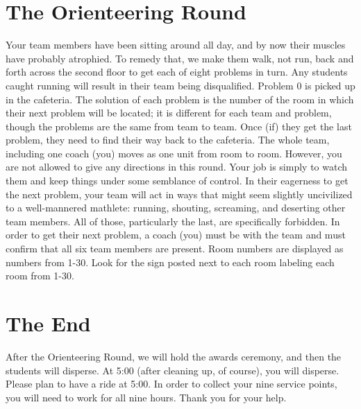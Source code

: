 \documentclass[11pt]{article}
\begin{document}
\begin{small}
\section{The Orienteering Round}
\noindent Your team members have been sitting around all day, and by now their muscles have probably atrophied. To remedy that, we make them walk, not run, back and forth across the second floor to get each of eight problems in turn. Any students caught running will result in their team being disqualified. Problem 0 is picked up in the cafeteria. The solution of each problem is the number of the room in which their next problem will be located; it is different for each team and problem, though the problems are the same from team to team. Once (if) they get the last problem, they need to find their way back to the cafeteria. The whole team, including one coach (you) moves as one unit from room to room. However, you are not allowed to give any directions in this round.  Your job is simply to watch them and keep things under some semblance of control.  In their eagerness to get the next problem, your team will act in ways that might seem slightly uncivilized to a well-mannered mathlete: running, shouting, screaming, and deserting other team members. All of those, particularly the last, are specifically forbidden. In order to get their next problem, a coach (you) must be with the team and must confirm that all six team members are present. Room numbers are displayed as numbers from 1-30. Look for the sign posted next to each room labeling each room from 1-30.

\section{The End}
\noindent After the Orienteering Round, we will hold the awards ceremony, and then the students will disperse. At 5:00 (after cleaning up, of course), you will disperse. Please plan to have a ride at 5:00. In order to collect your nine service points, you will need to work for all nine hours. Thank you for your help.

\end{small}	
\end{document}
